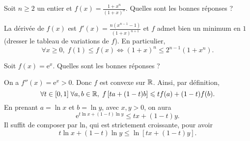 \begin{question}

Soit $n\geq 2$ un entier et $\displaystyle f(x)=\frac{1+x^n}{(1+x)^n}$. Quelles sont les bonnes réponses ?
\begin{answers}  
\end{answers}
\begin{explanations}
La dérivée de $f(x)$ est $\displaystyle f'(x)=\frac{n(x^{n-1}-1)}{(1+x)^{n+1}}$ et $f$ admet bien un minimum en $1$ (dresser le tableau de variations de $f$). En particulier,
$$\forall x\geq 0,\; f(1)\leq f(x)\Leftrightarrow (1+x)^n\leq 2^{n-1}(1+x^n).$$
\end{explanations}
\end{question}



\begin{question}

Soit $f(x)=\mathrm{e}^x$. Quelles sont les bonnes réponses ?
\begin{answers}  
\end{answers}
\begin{explanations}
On a $f''(x)=\mathrm{e}^x>0$. Donc $f$ est convexe sur $\mathbb{R}$. Ainsi, par définition,
$$\forall t\in [0,1]\; \forall a,b\in \mathbb{R},\; f\left[ta+(1-t)b\right]\leqslant tf(a)+(1-t)f(b).$$
En prenant $a=\ln x$ et $b=\ln y$, avec $x,y>0$, on aura
$$\mathrm{e}^{t\ln x+(1-t)\ln y}\leq tx+(1-t)y.$$
Il suffit de composer par ln, qui est strictement croissante, pour avoir
$$t\ln x+(1-t)\ln y\leq \ln \left[tx+(1-t)y\right].$$
\end{explanations}
\end{question}


